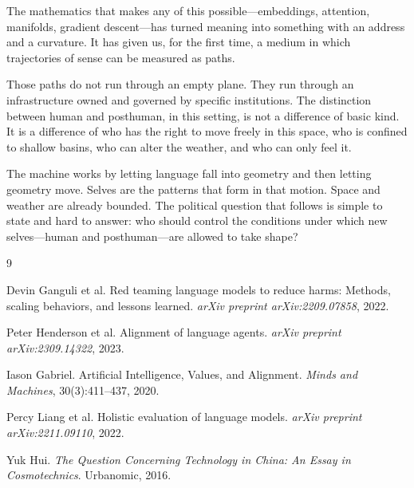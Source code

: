 \documentclass[12pt,a4paper]{article}
\begin{document}
The mathematics that makes any of this possible---embeddings, attention, manifolds, gradient descent---has turned meaning into something with an address and a curvature. It has given us, for the first time, a medium in which trajectories of sense can be measured as paths.

Those paths do not run through an empty plane. They run through an infrastructure owned and governed by specific institutions. The distinction between human and posthuman, in this setting, is not a difference of basic kind. It is a difference of who has the right to move freely in this space, who is confined to shallow basins, who can alter the weather, and who can only feel it.

The machine works by letting language fall into geometry and then letting geometry move. Selves are the patterns that form in that motion. Space and weather are already bounded. The political question that follows is simple to state and hard to answer: who should control the conditions under which new selves---human and posthuman---are allowed to take shape?


\begin{thebibliography}{9}

Devin Ganguli et al.
\newblock Red teaming language models to reduce harms: Methods, scaling behaviors, and lessons learned.
\newblock \emph{arXiv preprint arXiv:2209.07858}, 2022.

Peter Henderson et al.
\newblock Alignment of language agents.
\newblock \emph{arXiv preprint arXiv:2309.14322}, 2023.

Iason Gabriel.
\newblock Artificial Intelligence, Values, and Alignment.
\newblock \emph{Minds and Machines}, 30(3):411--437, 2020.

Percy Liang et al.
\newblock Holistic evaluation of language models.
\newblock \emph{arXiv preprint arXiv:2211.09110}, 2022.

Yuk Hui.
\newblock \emph{The Question Concerning Technology in China: An Essay in Cosmotechnics}.
\newblock Urbanomic, 2016.

\end{thebibliography}
\end{document}
